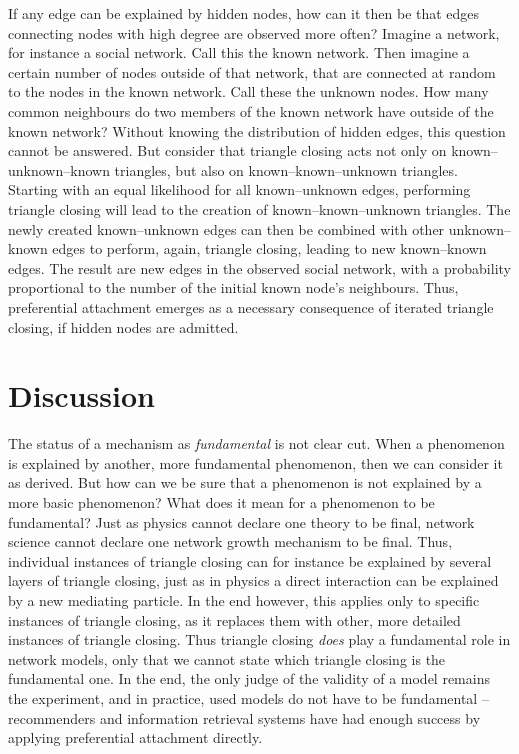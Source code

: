 \documentclass{acm_proc_article-sp}
\begin{document}
If any edge can be explained by hidden nodes, how can it then be that
edges connecting nodes with high degree are observed more often? 
Imagine a network, for instance a social
network.  Call this the known network.  Then imagine a certain number of
nodes outside of that 
network, that are connected at random to the nodes in the known
network.  Call these the unknown nodes.   How many common neighbours do
two members of the known network 
have outside of the known network?  Without knowing the distribution of
hidden edges, this question cannot be answered.  But consider that
triangle closing acts not only on known--unknown--known triangles, but
also on known--known--unknown triangles.  Starting with an equal
likelihood for all known--unknown edges, performing triangle closing
will lead to the creation of known--known--unknown triangles.  The newly
created known--unknown edges can then be combined with other
unknown--known edges to perform, again, triangle closing, leading to new 
known--known edges.  The result are new edges in the observed social
network, with a probability proportional to the number of the initial
known node's neighbours.  
Thus, preferential attachment emerges as a necessary consequence of
iterated triangle closing, if hidden nodes are admitted. 

\section{Discussion}
The status of a mechanism as \emph{fundamental} is not clear cut.  When
a phenomenon is explained by another, more fundamental phenomenon, then
we can consider it as derived.  But how can we be sure that a phenomenon
is not explained by a more basic phenomenon?  What does it mean for a
phenomenon to be fundamental?  Just as physics cannot declare one theory
to be final, network science cannot declare one network growth mechanism
to be final.  Thus, individual instances of triangle closing can for
instance be explained by several layers of triangle closing, just as in
physics a direct interaction can be explained by a new mediating
particle.  In the end however, this applies only to specific instances
of triangle closing, as it replaces them with other, more detailed
instances of triangle closing.  Thus triangle closing \emph{does} play a
fundamental role in network models, only that we cannot state which
triangle closing is the fundamental one.  In the end, the only judge of
the validity of a model remains the experiment, and in practice, used
models do not have to be fundamental -- recommenders and information
retrieval systems have had enough success by applying 
preferential attachment directly.


  
\end{document}
